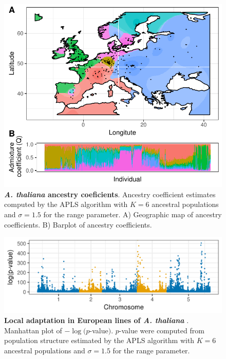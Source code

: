 \clearpage 
\newpage

\begin{figure}
  \centering
  \includegraphics[width=\textwidth]{./Figures/map.pdf}
  \caption{{\bf {\it A. thaliana} ancestry coeficients}. Ancestry coefficient
    estimates computed by the APLS algorithm with $K=6$ ancestral populations
    and $\sigma = 1.5$ for the range parameter. A) Geographic map of ancestry
    coefficients. B) Barplot of ancestry coefficients.}
  \label{fig:map}
\end{figure}

\clearpage 
\newpage

\begin{figure}
  \centering
  \includegraphics[width=\textwidth]{./Figures/manhattanplot.png}
  \caption{{\bf Local adaptation in European lines of \bf {\it A. thaliana} }.
    Manhattan plot of $-\log(p$\rm -value$)$. $p$-value were computed from
    population structure estimated by the APLS algorithm with $K=6$ ancestral
    populations and $\sigma = 1.5$ for the range parameter.}
  \label{fig:man}
\end{figure}

\clearpage 
\newpage
